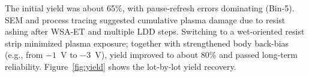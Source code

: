 The initial yield was about 65\%, with pause-refresh errors dominating (Bin-5). SEM and process tracing suggested cumulative plasma damage due to resist ashing after WSA-ET and multiple LDD steps. Switching to a wet-oriented resist strip minimized plasma exposure; together with strengthened body back-bias (e.g., from $-1$~V to $-3$~V), yield improved to about 80\% and passed long-term reliability. Figure~\ref{fig:yield} shows the lot-by-lot yield recovery.
